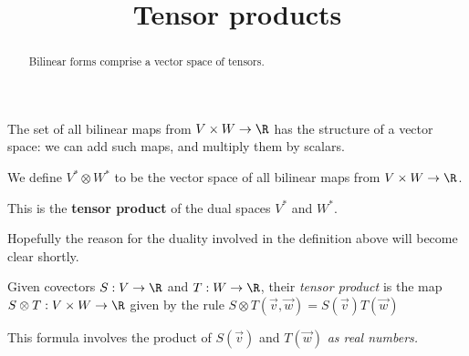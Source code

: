 \documentclass{ximera}
\title{Tensor products}
\begin{document}
\begin{abstract}
  Bilinear forms comprise a vector space of tensors.
\end{abstract}\maketitle	

The set of all bilinear maps from $V \times W \to \R$ has the structure of a vector space: we can add such maps, and multiply them by scalars.

\begin{definition}
  We define $V^* \otimes W^*$ to be the vector space of all bilinear maps from $V \times W \to \R$.

  This is the \textbf{tensor product} of the dual spaces $V^*$ and $W^*$.
\end{definition}
	
Hopefully the reason for the duality involved in the definition above will become clear shortly.
				
Given covectors $S : V \to \R$ and $T : W \to \R$, their \textit{tensor product} is the map 
$S \otimes T: V \times W \to \R$ given by the rule $S \otimes T(\vec{v},\vec{w}) = S(\vec{v}) T(\vec{w})$

\begin{warning}
This formula involves the product of $S(\vec{v})$ and $T(\vec{w})$ \textit{as real numbers.}
\end{warning}
\end{document}
